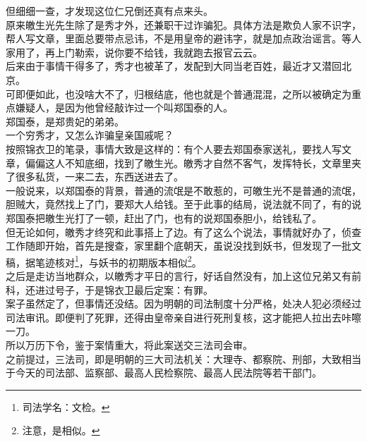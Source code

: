 \begin{multicols}{\theparacolNo}
但细细一查，才发现这位仁兄倒还真有点来头。\\

原来皦生光先生除了是秀才外，还兼职干过诈骗犯。具体方法是欺负人家不识字，帮人写文章，里面总要带点忌讳，不是用皇帝的避讳字，就是加点政治谣言。等人家用了，再上门勒索，说你要不给钱，我就跑去报官云云。\\

后来由于事情干得多了，秀才也被革了，发配到大同当老百姓，最近才又潜回北京。\\

可即便如此，也没啥大不了，归根结底，他也就是个普通混混，之所以被确定为重点嫌疑人，是因为他曾经敲诈过一个叫郑国泰的人。\\

郑国泰，是郑贵妃的弟弟。\\

一个穷秀才，又怎么诈骗皇亲国戚呢？\\

按照锦衣卫的笔录，事情大致是这样的：有个人要去郑国泰家送礼，要找人写文章，偏偏这人不知底细，找到了皦生光。皦秀才自然不客气，发挥特长，文章里夹了很多私货，一来二去，东西送进去了。\\

一般说来，以郑国泰的背景，普通的流氓是不敢惹的，可皦生光不是普通的流氓，胆贼大，竟然找上了门，要郑大人给钱。至于此事的结局，说法就不同了，有的说郑国泰把皦生光打了一顿，赶出了门，也有的说郑国泰胆小，给钱私了。\\

但无论如何，皦秀才终究和此事搭上了边。有了这么个说法，事情就好办了，侦查工作随即开始，首先是搜查，家里翻个底朝天，虽说没找到妖书，但发现了一批文稿，据笔迹核对\footnote{司法学名：文检。}，与妖书的初期版本相似\footnote{注意，是相似。}。\\

之后是走访当地群众，以皦秀才平日的言行，好话自然没有，加上这位兄弟又有前科，还进过号子，于是锦衣卫最后定案：有罪。\\

案子虽然定了，但事情还没结。因为明朝的司法制度十分严格，处决人犯必须经过司法审讯。即便判了死罪，还得由皇帝亲自进行死刑复核，这才能把人拉出去咔嚓一刀。\\

所以万历下令，鉴于案情重大，将此案送交三法司会审。\\

之前提过，三法司，即是明朝的三大司法机关：大理寺、都察院、刑部，大致相当于今天的司法部、监察部、最高人民检察院、最高人民法院等若干部门。\\


\end{multicols}
